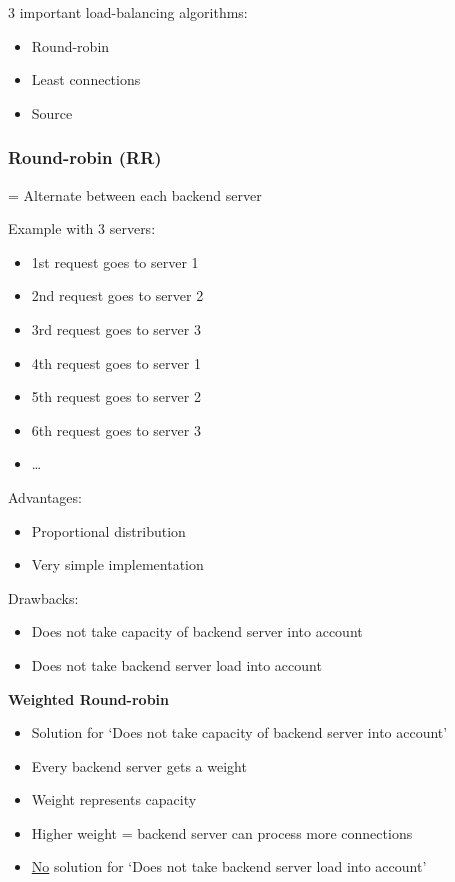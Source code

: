 \documentclass{article}
\begin{document}
3 important load-balancing algorithms:

\begin{itemize}
    \item Round-robin
    \item Least connections
    \item Source
\end{itemize}

\subsubsection{Round-robin (RR)}

= Alternate between each backend server

Example with 3 servers:

\begin{itemize}
    \item 1st request goes to server 1
    \item 2nd request goes to server 2
    \item 3rd request goes to server 3
    \item 4th request goes to server 1
    \item 5th request goes to server 2
    \item 6th request goes to server 3
    \item \dots
\end{itemize}

Advantages:

\begin{itemize}
    \item Proportional distribution
    \item Very simple implementation
\end{itemize}

Drawbacks:

\begin{itemize}
    \item Does not take capacity of backend server into account
    \item Does not take backend server load into account
\end{itemize}

\textbf{Weighted Round-robin}

\begin{itemize}
    \item Solution for `Does not take capacity of backend server into account'
    \item Every backend server gets a weight
    \item Weight represents capacity
    \item Higher weight = backend server can process more connections
    \item \underline{No} solution for `Does not take backend server load into account'
\end{itemize}
\end{document}
